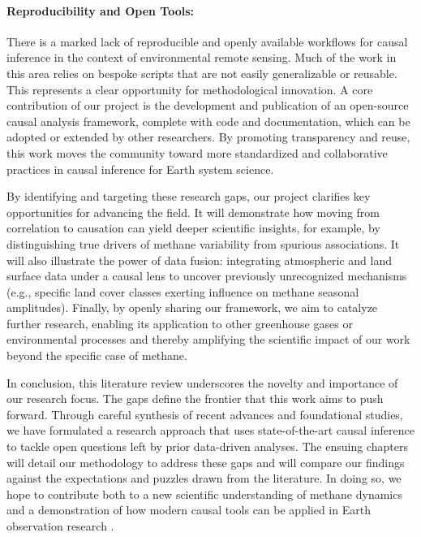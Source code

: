 \paragraph{Reproducibility and Open Tools:} 
There is a marked lack of reproducible and openly available workflows for causal inference in the context of environmental remote sensing. Much of the work in this area relies on bespoke scripts that are not easily generalizable or reusable. This represents a clear opportunity for methodological innovation. A core contribution of our project is the development and publication of an open-source causal analysis framework, complete with code and documentation, which can be adopted or extended by other researchers. By promoting transparency and reuse, this work moves the community toward more standardized and collaborative practices in causal inference for Earth system science.

\medskip

By identifying and targeting these research gaps, our project clarifies key opportunities for advancing the field. It will demonstrate how moving from correlation to causation can yield deeper scientific insights, for example, by distinguishing true drivers of methane variability from spurious associations. It will also illustrate the power of data fusion: integrating atmospheric and land surface data under a causal lens to uncover previously unrecognized mechanisms (e.g., specific land cover classes exerting influence on methane seasonal amplitudes). Finally, by openly sharing our framework, we aim to catalyze further research, enabling its application to other greenhouse gases or environmental processes and thereby amplifying the scientific impact of our work beyond the specific case of methane.

In conclusion, this literature review underscores the novelty and importance of our research focus. The gaps define the frontier that this work aims to push forward. Through careful synthesis of recent advances and foundational studies, we have formulated a research approach that uses state-of-the-art causal inference to tackle open questions left by prior data-driven analyses. The ensuing chapters will detail our methodology to address these gaps and will compare our findings against the expectations and puzzles drawn from the literature. In doing so, we hope to contribute both to a new scientific understanding of methane dynamics and a demonstration of how modern causal tools can be applied in Earth observation research \cite{Runge2019}.




